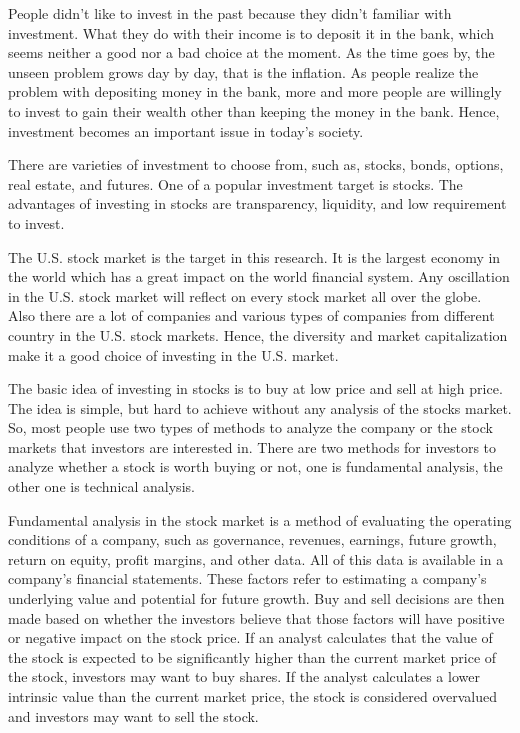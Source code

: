 \documentclass[../main.tex]{subfiles}
\begin{document}

People didn't like to invest in the past because they didn't familiar with investment. What they do with their income is to deposit it in the bank, which seems neither a good nor a bad choice at the moment. As the time goes by, the unseen problem grows day by day, that is the inflation. As people realize the problem with depositing money in the bank, more and more people are willingly to invest to gain their wealth other than keeping the money in the bank. Hence, investment becomes an important issue in today's society.

\bigbreak

There are varieties of investment to choose from, such as, stocks, bonds, options, real estate, and futures. One of a popular investment target is stocks. The advantages of investing in stocks are transparency, liquidity, and low requirement to invest.

\bigbreak

The U.S. stock market is the target in this research. It is the largest economy in the world which has a great impact on the world financial system. Any oscillation in the U.S. stock market will reflect on every stock market all over the globe. Also there are a lot of companies and various types of companies from different country in the U.S. stock markets. Hence, the diversity and market capitalization make it a good choice of investing in the U.S. market.

\bigbreak

The basic idea of investing in stocks is to buy at low price and sell at high price. The idea is simple, but hard to achieve without any analysis of the stocks market. So, most people use two types of methods to analyze the company or the stock markets that investors are interested in. There are two methods for investors to analyze whether a stock is worth buying or not, one is fundamental analysis, the other one is technical analysis.

\bigbreak

Fundamental analysis in the stock market is a method of evaluating the operating conditions of a company, such as governance, revenues, earnings, future growth, return on equity, profit margins, and other data. All of this data is available in a company's financial statements. These factors refer to estimating a company's underlying value and potential for future growth. Buy and sell decisions are then made based on whether the investors believe that those factors will have positive or negative impact on the stock price. If an analyst calculates that the value of the stock is expected to be significantly higher than the current market price of the stock, investors may want to buy shares. If the analyst calculates a lower intrinsic value than the current market price, the stock is considered overvalued and investors may want to sell the stock.
\end{document}
